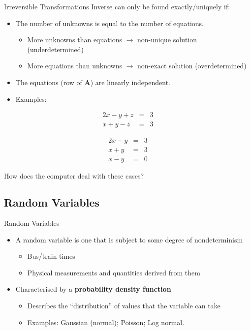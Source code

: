 \documentclass{beamer}
\newcommand{\bA}{\mathbf{A}}
\begin{document}
\begin{frame}{Irreversible Transformations}
  Inverse can only be found exactly/uniquely if:
  \begin{itemize}  
  \item The number of unknowns is equal to the number of equations.
    \begin{itemize}
    \item More unknowns than equations $\rightarrow$ non-unique solution (underdetermined)
    \item More equations than unknowns $\rightarrow$ non-exact solution (overdetermined)
    \end{itemize}
  \item The equations (row of $\bA$) are linearly independent.
  \item Examples:
  \end{itemize}
  \begin{minipage}[t]{0.45\textwidth}
    \begin{eqnarray*}
      2x-y+z & = & 3 \\
      x+y-z & = & 3 
    \end{eqnarray*}
  \end{minipage}
  \begin{minipage}[t]{0.45\textwidth}
    \begin{eqnarray*}
      2x-y &=& 3\\
      x+y & = & 3 \\
      x-y & = & 0
    \end{eqnarray*}
  \end{minipage}

  How does the computer deal with these cases?
\end{frame}







\subsection{Random Variables}
\begin{frame}{Random Variables}
  \begin{itemize}
    \item A random variable is one that is subject to some degree of nondeterminism
      \begin{itemize}
        \item Bus/train times
        \item Physical measurements and quantities derived from them
      \end{itemize}
    \item Characterised by a \textbf{probability density function}
      \begin{itemize}
        \item Describes the ``distribution'' of values that the variable can take
        \item Examples: Gaussian (normal); Poisson; Log normal.
      \end{itemize}
  \end{itemize}
\end{frame}
\end{document}
